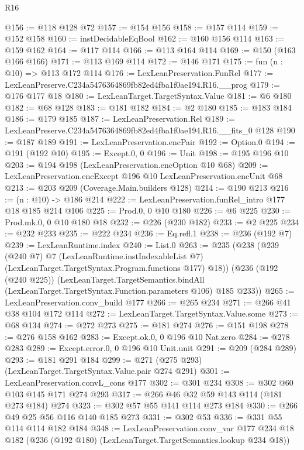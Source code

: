 \begin{lexlean}{R16}
\begin{coremodule}
@156 := @118 @128 @72
@157 := @154 @156
@158 := @157 @114
@159 := @152 @158
@160 := instDecidableEqBool
@162 := @160 @156 @114
@163 := @159 @162
@164 := @117 @114
@166 := @113 @164 @114
@169 := @150 (@163 @166 @166)
@171 := @113 @169 @114
@172 := @146 @171
@175 := fun (n : @10) => @113 @172 @114
@176 := LexLeanPreservation.FunRel
@177 := LexLeanPreserve.C234a5476364869fb82ed4fba1f0ae194.R16.__prog
@179 := @176 @177 @18
@180 := LexLeanTarget.TargetSyntax.Value
@181 := @6 @180
@182 := @68 @128
@183 := @181 @182
@184 := @2 @180
@185 := @183 @184
@186 := @179 @185
@187 := LexLeanPreservation.Rel
@189 := LexLeanPreserve.C234a5476364869fb82ed4fba1f0ae194.R16.__fits_0 @128
@190 := @187 @189
@191 := LexLeanPreservation.encPair
@192 := Option.{0}
@194 := @191 (@192 @10)
@195 := Except.{0, 0}
@196 := Unit
@198 := @195 @196 @10
@203 := @194 @198 (LexLeanPreservation.encOption @10 @68)
@209 := LexLeanPreservation.encExcept @196 @10 LexLeanPreservation.encUnit @68
@213 := @203 @209 (Coverage.Main.builders @128)
@214 := @190 @213
@216 := (n : @10) -> @186 @214
@222 := LexLeanPreservation.funRel_intro @177 @18 @185 @214 @106
@225 := Prod.{0, 0} @10 @180
@226 := @6 @225
@230 := Prod.mk.{0, 0} @10 @180 @18
@232 := @226 (@230 @182)
@233 := @2 @225
@234 := @232 @233
@235 := @222 @234
@236 := Eq.refl.{1}
@238 := @236 (@192 @7)
@239 := LexLeanRuntime.index
@240 := List.{0}
@263 := @235
    (@238
      (@239
        (@240 @7)
        @7
        (LexLeanRuntime.instIndexableList @7)
        (LexLeanTarget.TargetSyntax.Program.functions @177)
        @18))
    (@236
      (@192 (@240 @225))
      (LexLeanTarget.TargetSemantics.bindAll
        (LexLeanTarget.TargetSyntax.Function.parameters @106)
        @185
        @233))
@265 := LexLeanPreservation.conv_build @177
@266 := @265 @234
@271 := @266 @41 @38 @104 @172 @114
@272 := LexLeanTarget.TargetSyntax.Value.some
@273 := @68 @134
@274 := @272 @273
@275 := @181 @274
@276 := @151 @198
@278 := @276 @158 @162
@283 := Except.ok.{0, 0} @196 @10 Nat.zero
@284 := @278 @283
@289 := Except.error.{0, 0} @196 @10 Unit.unit
@291 := @209 (@284 @289)
@293 := @181 @291 @184
@299 := @271 (@275 @293) (LexLeanTarget.TargetSyntax.Value.pair @274 @291)
@301 := LexLeanPreservation.convL_cons @177
@302 := @301 @234
@308 := @302 @60 @103 @145 @171 @274 @293
@317 := @266 @46 @32 @59 @143 @114 (@181 @273 @184) @274
@323 := @302 @57 @55 @141 @114 @273 @184
@330 := @266 @49 @25 @56 @116 @140 @185 @273
@331 := @302 @53
@336 := @331 @55 @114 @114 @182 @184
@348 := LexLeanPreservation.conv_var
    @177
    @234
    @18
    @182
    (@236 (@192 @180) (LexLeanTarget.TargetSemantics.lookup @234 @18))

\end{coremodule}
\end{lexlean}
